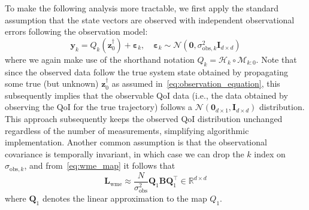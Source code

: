 \documentclass[final,1p,times]{elsarticle}
\begin{document}
To make the following analysis more tractable, we first apply the standard assumption that the state vectors are observed with independent observational errors following the observation model:
\begin{equation}
    \mathbf{y}_k=Q_{k}\left(\mathbf{z}_{0}^\dagger\right)+\mathbf{\varepsilon}_{k}, \quad \mathbf{\varepsilon}_{k} \sim \mathcal{N}\left(\boldsymbol{0}, \sigma_{\mathrm{obs},k}^2 \boldsymbol{I}_{d\times d}\right)    \label{eq:observation_equation}
\end{equation}
where we again make use of the shorthand notation $Q_k=\mathcal{H}_k\circ\mathcal{M}_{k:0}$.
Note that since the observed data follow the true system state obtained by propagating some true (but unknown) $ \mathbf{z}_{0}^{\dagger} $ as assumed in~\eqref{eq:observation_equation}, this subsequently implies that the observable QoI data (i.e., the data obtained by observing the QoI for the true trajectory) follows a $ \mathcal{N}\left(\mathbf{0}_{d \times 1}, \mathbf{I}_{d \times d}\right) $ distribution. 
This approach subsequently keeps the observed QoI distribution unchanged regardless of the number of measurements, simplifying algorithmic implementation. 
Another common assumption is that the observational covariance is temporally invariant, in which case we can drop the $k$ index on $\sigma_{\text{obs},k}$, and from~\eqref{eq:wme_map} it follows that
\begin{equation}
    \mathbf{L}_\mathrm{wme} \approx \frac{N}{\sigma_{\text{obs}}^2}  \mathbf{Q}_1 \mathbf{B} \mathbf{Q}_1^\top \in \mathbb{R}^{d \times d}  \label{eq:wme_pred_cov}
\end{equation}
where $\mathbf{Q}_1$ denotes the linear approximation to the map $Q_1$. 
\end{document}
